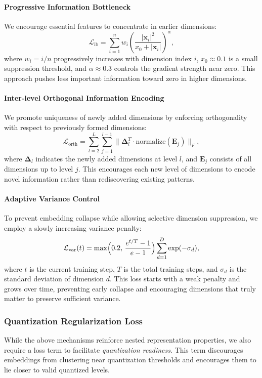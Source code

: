 \paragraph{Progressive Information Bottleneck}
We encourage essential features to concentrate in earlier dimensions:
\begin{equation}
    \mathcal{L}_{\text{ib}} = \sum_{i=1}^{n} w_i 
    \left(\frac{|\mathbf{x}_i|^2}{x_0 + |\mathbf{x}_i|}\right)^\alpha,
\end{equation}
where $w_i = i/n$ progressively increases with dimension index $i$, $x_0 \approx 0.1$ is a small suppression threshold, and $\alpha\approx 0.3$ controls the gradient strength near zero. This approach pushes less important information toward zero in higher dimensions.

\paragraph{Inter-level Orthogonal Information Encoding}
We promote uniqueness of newly added dimensions by enforcing orthogonality with respect to previously formed dimensions:
\begin{equation}
    \mathcal{L}_{\text{orth}} = \sum_{l=2}^{L} \sum_{j=1}^{l-1} \|\mathbf{\Delta}_l^T \cdot \text{normalize}(\mathbf{E}_j)\|_F,
\end{equation}
where $\mathbf{\Delta}_l$ indicates the newly added dimensions at level $l$, and $\mathbf{E}_j$ consists of all dimensions up to level $j$. This encourages each new level of dimensions to encode novel information rather than rediscovering existing patterns.

\paragraph{Adaptive Variance Control}
To prevent embedding collapse while allowing selective dimension suppression, we employ a slowly increasing variance penalty:
\begin{equation}
    \mathcal{L}_{\text{var}}(t) 
    = 
    \max\Bigl(0.2,\, \frac{e^{t/T} - 1}{e - 1}\Bigr) 
    \sum_{d=1}^D 
    \exp(-\sigma_d),
\end{equation}
where $t$ is the current training step, $T$ is the total training steps, and $\sigma_d$ is the standard deviation of dimension $d$. This loss starts with a weak penalty and grows over time, preventing early collapse and encouraging dimensions that truly matter to preserve sufficient variance.

\subsubsection{Quantization Regularization Loss}
\label{subsubsec:quant_reg}
While the above mechanisms reinforce nested representation properties, we also require a loss term to facilitate \emph{quantization readiness}. This term discourages embeddings from clustering near quantization thresholds and encourages them to lie closer to valid quantized levels.

